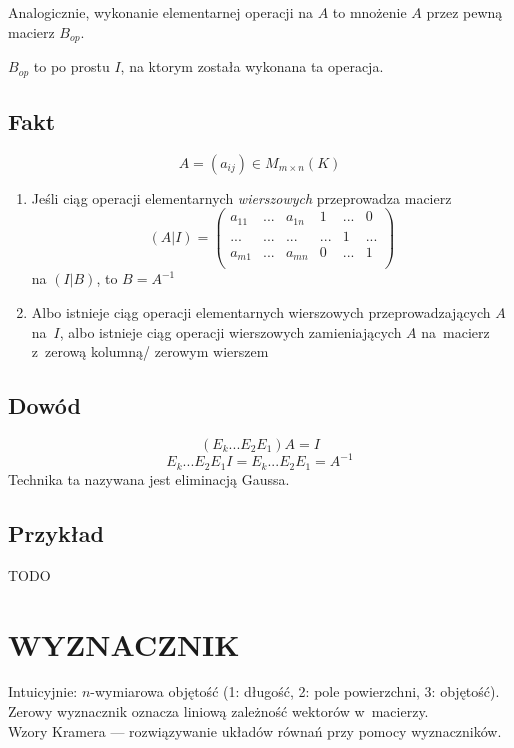 \documentclass{article}
\begin{document}
  Analogicznie, wykonanie elementarnej operacji na $A$ to
  mnożenie $A$ przez pewną macierz $B_{op}$.
  
  $B_{op}$ to po prostu $I$, na ktorym została wykonana ta operacja.

  \subsection*{Fakt}
  \[A = (a_{ij}) \in M_{m\times n}(K)\]
  \begin{enumerate}
    \item Jeśli ciąg operacji elementarnych \textit{wierszowych} przeprowadza
      macierz \[(A|I)=\begin{pmatrix}
        a_{11}&...&a_{1n}& 1 &...& 0 \\
        ...&...&...&...& 1 &...\\
        a_{m1}&...&a_{mn}& 0 &...& 1 \\
      \end{pmatrix}\]
      na $(I|B)$, to $B = A^{-1}$
    \item Albo istnieje ciąg operacji elementarnych wierszowych
      przeprowadzających $A$ na~$I$, albo istnieje ciąg operacji
      wierszowych zamieniających $A$ na~macierz z~zerową kolumną/
      zerowym wierszem
  \end{enumerate}

  \subsection*{Dowód}
  \[(E_k...E_2E_1)A=I\]
  \[E_k...E_2E_1I=E_k...E_2E_1=A^{-1}\]
  Technika ta nazywana jest eliminacją Gaussa.

  \subsection*{Przykład}
  TODO %

  \section*{WYZNACZNIK}
  Intuicyjnie: $n$-wymiarowa objętość (1: długość, 2: pole powierzchni, 3: objętość). \\
  Zerowy wyznacznik oznacza liniową zależność wektorów w~macierzy. \\
  Wzory Kramera --- rozwiązywanie układów równań przy pomocy wyznaczników.
\end{document}
